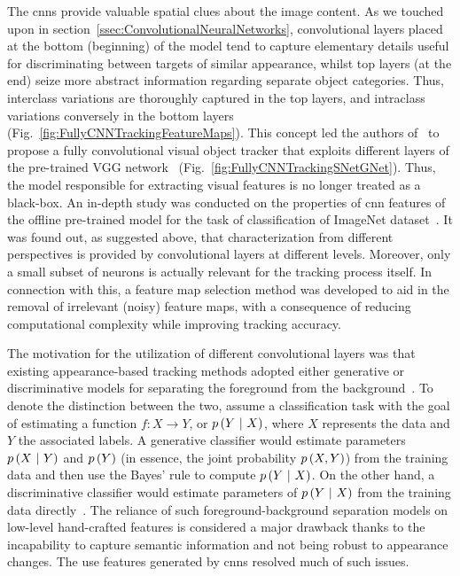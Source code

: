 The \glspl{cnn} provide valuable spatial clues about the image content. As we touched upon in section~\ref{ssec:ConvolutionalNeuralNetworks}, convolutional layers placed at the bottom (beginning) of the model tend to capture elementary details useful for discriminating between targets of similar appearance, whilst top layers (at the end) seize more abstract information regarding separate object categories. Thus, interclass variations are thoroughly captured in the top layers, and intraclass variations conversely in the bottom layers (Fig.~\ref{fig:FullyCNNTrackingFeatureMaps}). This concept led the authors of~\cite{Wang2015} to propose a fully convolutional visual object tracker that exploits different layers of the pre-trained VGG network~\cite{Simonyan2015} (Fig.~\ref{fig:FullyCNNTrackingSNetGNet}). Thus, the model responsible for extracting visual features is no longer treated as a black-box. An in-depth study was conducted on the properties of \gls{cnn} features of the offline pre-trained model for the task of classification of ImageNet dataset~\cite{JiaDeng2009}. It was found out, as suggested above, that characterization from different perspectives is provided by convolutional layers at different levels. Moreover, only a small subset of neurons is actually relevant for the tracking process itself. In connection with this, a feature map selection method was developed to aid in the removal of irrelevant (noisy) feature maps, with a consequence of reducing computational complexity while improving tracking accuracy.

The motivation for the utilization of different convolutional layers was that existing appearance-based tracking methods adopted either generative or discriminative models for separating the foreground from the background~\cite{Wang2015}. To denote the distinction between the two, assume a classification task with the goal of estimating a function $f: X \to Y$, or $p \left( Y \ | \ X \right)$, where $X$ represents the data and $Y$ the associated labels. A generative classifier would estimate parameters $p \left( X \ | \ Y \right)$ and $p \left( Y \right)$ (in essence, the joint probability $p \left( X, Y \right)$) from the training data and then use the Bayes' rule to compute $p \left( Y \ | \ X \right)$. On the other hand, a discriminative classifier would estimate parameters of $p \left( Y \ | \ X \right)$ from the training data directly~\cite{ng2002discriminative}. The reliance of such foreground-background separation models on low-level hand-crafted features is considered a major drawback thanks to the incapability to capture semantic information and not being robust to appearance changes. The use features generated by \glspl{cnn} resolved much of such issues.


